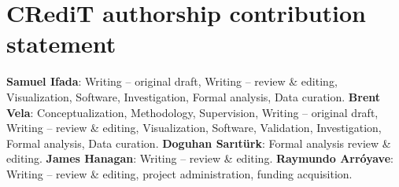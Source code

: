 \section*{CRediT authorship contribution statement}
\textbf{Samuel Ifada}: Writing – original draft, Writing – review \& editing, Visualization, Software, Investigation, Formal analysis, Data curation.
\textbf{Brent Vela}: Conceptualization, Methodology, Supervision, Writing –
original draft, Writing – review \& editing, Visualization, Software,
Validation, Investigation, Formal analysis, Data curation.
\textbf{Doguhan Sar{\i}t\"urk}: Formal analysis  review \& editing.
\textbf{James Hanagan}: Writing – review \& editing.
\textbf{Raymundo Arr\'oyave}: Writing – review \& editing, project
administration, funding acquisition.

